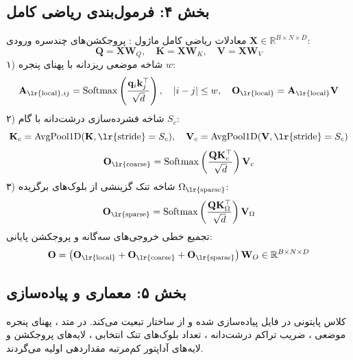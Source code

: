 \subsection*{بخش ۴: فرمول‌بندی ریاضی کامل }
معادلات ریاضی کامل ماژول :
پروجکشن‌های چندسره ورودی $\mathbf{X} \in \mathbb{R}^{B \times N \times D}$:
\begin{equation}
\mathbf{Q} = \mathbf{X}\mathbf{W}_Q, \quad \mathbf{K} = \mathbf{X}\mathbf{W}_K, \quad \mathbf{V} = \mathbf{X}\mathbf{W}_V
\end{equation}
۱) شاخه موضعی ریزدانه با پهنای پنجره $w$:
\begin{equation}
\mathbf{A}_{\text{\lr{local}}, ij} = \operatorname{Softmax}\left(\frac{\mathbf{q}_i \mathbf{k}_j^\top}{\sqrt{d}}\right), \quad |i - j| \le w, \quad \mathbf{O}_{\text{\lr{local}}} = \mathbf{A}_{\text{\lr{local}}}\mathbf{V}
\end{equation}
۲) شاخه فشرده‌سازی درشت‌دانه با گام $S_c$:
\begin{equation}
\mathbf{K}_c = \operatorname{AvgPool1D}(\mathbf{K}, \text{\lr{stride}}=S_c), \quad \mathbf{V}_c = \operatorname{AvgPool1D}(\mathbf{V}, \text{\lr{stride}}=S_c)
\end{equation}
\begin{equation}
\mathbf{O}_{\text{\lr{coarse}}} = \operatorname{Softmax}\left(\frac{\mathbf{Q}\mathbf{K}_c^\top}{\sqrt{d}}\right)\mathbf{V}_c
\end{equation}
۳) شاخه تنک گزینشی از بلوک‌های برگزیده $\Omega_{\text{\lr{sparse}}}$:
\begin{equation}
\mathbf{O}_{\text{\lr{sparse}}} = \operatorname{Softmax}\left(\frac{\mathbf{Q}\mathbf{K}_{\Omega}^\top}{\sqrt{d}}\right)\mathbf{V}_{\Omega}
\end{equation}
تجمیع خطی خروجی‌های سه‌گانه و پروجکشن پایانی:
\begin{equation}
\mathbf{O} = \left(\mathbf{O}_{\text{\lr{local}}} + \mathbf{O}_{\text{\lr{coarse}}} + \mathbf{O}_{\text{\lr{sparse}}}\right)\mathbf{W}_O \in \mathbb{R}^{B \times N \times D}
\end{equation}

\subsection*{بخش ۵: معماری و پیاده‌سازی }
کلاس پایتونی  در فایل  پیاده‌سازی شده و از ساختار  تبعیت می‌کند. در متد ، پهنای پنجره موضعی ، ضریب تراکم درشت‌دانه ، تعداد بلوک‌های تنک انتخابی ، لایه‌های پروجکشن و لایه‌های آداپتور کم‌مرتبه مقداردهی اولیه می‌گردند.

